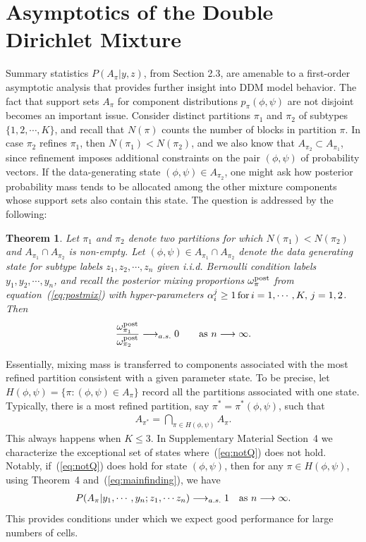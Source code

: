 \documentclass[aoas,preprint]{imsart}
\newtheorem{theorem}{Theorem}
\begin{document}
\section{Asymptotics of the Double Dirichlet Mixture}
Summary statistics $P(A_\pi|y,z)$, from Section 2.3, are amenable to a first-order asymptotic analysis
that provides further insight into DDM model behavior.  The fact that support sets $A_\pi$ for component 
distributions $p_\pi( \phi,\psi)$ are not disjoint becomes an important issue.  Consider
distinct partitions $\pi_1$ and $\pi_2$  of subtypes $\{ 1, 2, \cdots, K\}$, and recall that $N(\pi)$ counts
 the number of blocks in partition $\pi$.   In case $\pi_2$ refines $\pi_1$, then $N(\pi_1) < N(\pi_2)$,
and  we also know that 
 $A_{\pi_2} \subset A_{\pi_1}$, since refinement 
imposes additional constraints on the pair $(\phi, \psi)$ of probability vectors.   
If the data-generating state $(\phi, \psi) \in A_{\pi_2}$, one might ask how posterior probability mass
tends to be allocated among the other mixture components whose
 support sets also contain this state.     The question is addressed 
by the following:

\begin{theorem}  Let $\pi_1$ and $\pi_2$ denote two partitions for which $N(\pi_1) < N(\pi_2)$
 and $A_{\pi_1} \cap A_{\pi_2}$ is non-empty. 
 Let $(\phi,\psi) \in A_{\pi_1} \cap A_{\pi_2}$ denote the data generating state for 
subtype labels $z_1, z_2, \cdots, z_n$ given i.i.d. Bernoulli condition labels $y_1, y_2, \cdots, y_n$, 
and recall the posterior mixing proportions $\omega^{\rm post}_\pi$ from equation~(\ref{eq:postmix}) with 
hyper-parameters $\alpha_i^j \geq 1 \, {\mbox {\rm for}} \,  i = 1, \cdots, K, \, j = 1,2$.   Then
\begin{eqnarray*}
\frac{\omega^{\rm post}_{\pi_1} }{ \omega^{\rm post}_{\pi_2} } \longrightarrow_{a.s.} 0 \qquad 
 {\mbox {\rm as $n \longrightarrow \infty$}}. 
\end{eqnarray*}
\end{theorem}
Essentially, mixing mass is transferred to components associated with the most refined partition
consistent with a given parameter state.  To be precise, let $H(\phi,\psi) = \{ \pi: (\phi,\psi) \in A_{\pi} \}$
record all the partitions associated with one state.   Typically, there is a most refined partition,
say $\pi^* = \pi^*(\phi,\psi)$, such that
\begin{eqnarray}
\label{eq:notQ}
A_{\pi^*} = \bigcap_{\pi \in H(\phi,\psi)} A_\pi.
\end{eqnarray}
This always happens when $K \leq 3$.  In Supplementary Material Section~4 we characterize 
the exceptional set of states where~(\ref{eq:notQ}) does not hold.  Notably, if~(\ref{eq:notQ}) does hold for
state $(\phi,\psi)$, then for any $\pi \in H(\phi,\psi)$, using Theorem~4 and~(\ref{eq:mainfinding}), we have
\begin{eqnarray*}
P(A_\pi|y_1,\cdots,y_n; z_1, \cdots z_n ) \longrightarrow_{a.s.} 1 \quad {\mbox {\rm as $n \longrightarrow \infty$}}.
\end{eqnarray*}
This provides conditions under which we expect good performance for large numbers of cells.
\end{document}
